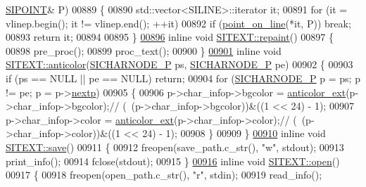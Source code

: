 \begin{DoxyCode}
      \hyperlink{struct_s_i_p_o_i_n_t}{SIPOINT}& P)
00889 \{
00890     std::vector<SILINE>::iterator it;
00891     \textcolor{keywordflow}{for} (it = vlinep.begin(); it != vlinep.end(); ++it)
00892         \textcolor{keywordflow}{if} (\hyperlink{kernal_8h_ae39165f0f00583edee6fe18ea6bdf5e3}{point\_on\_line}(*it, P)) \textcolor{keywordflow}{break};
00893     \textcolor{keywordflow}{return} it;
00894 
00895 \}
\hyperlink{class_s_i_t_e_x_t_a944194c2df3c4ba2c599de6fbe0f98c2}{00896} \textcolor{keyword}{inline} \textcolor{keywordtype}{void} \hyperlink{class_s_i_t_e_x_t_a944194c2df3c4ba2c599de6fbe0f98c2}{SITEXT::repaint}()
00897 \{
00898     pre\_proc();
00899     proc\_text();
00900 \}
\hyperlink{class_s_i_t_e_x_t_af62ce4105e9450cc8c2319fed9fa7218}{00901} \textcolor{keyword}{inline} \textcolor{keywordtype}{void} \hyperlink{class_s_i_t_e_x_t_af62ce4105e9450cc8c2319fed9fa7218}{SITEXT::anticolor}(\hyperlink{class_s_i_c_h_a_r_n_o_d_e}{SICHARNODE\_P} ps, 
      \hyperlink{class_s_i_c_h_a_r_n_o_d_e}{SICHARNODE\_P} pe)
00902 \{
00903     \textcolor{keywordflow}{if} (ps == NULL || pe == NULL) \textcolor{keywordflow}{return};
00904     \textcolor{keywordflow}{for} (\hyperlink{class_s_i_c_h_a_r_n_o_d_e}{SICHARNODE\_P} p = ps; p != pe; p = p->\hyperlink{class_s_i_c_h_a_r_n_o_d_e_ab188ae5c7731bcc66a1042defcf158c8}{nextp})
00905     \{
00906         p->char\_infop->bgcolor = \hyperlink{kernal_8h_abd07a7735390aea7bf376c2bcc75bd96}{anticolor\_ext}(p->char\_infop->bgcolor);\textcolor{comment}{//
      (~(p->char\_infop->bgcolor))&((1 << 24) - 1);}
00907         p->char\_infop->color = \hyperlink{kernal_8h_abd07a7735390aea7bf376c2bcc75bd96}{anticolor\_ext}(p->char\_infop->color);\textcolor{comment}{//
      (~(p->char\_infop->color))&((1 << 24) - 1);}
00908     \}
00909 \}
\hyperlink{class_s_i_t_e_x_t_a4dd44878d55139898fcead669e074c2e}{00910} \textcolor{keyword}{inline} \textcolor{keywordtype}{void} \hyperlink{class_s_i_t_e_x_t_a4dd44878d55139898fcead669e074c2e}{SITEXT::save}()
00911 \{
00912     freopen(save\_path.c\_str(), \textcolor{stringliteral}{"w"}, stdout);
00913     print\_info();
00914     fclose(stdout);
00915 \}
\hyperlink{class_s_i_t_e_x_t_a270a832a88596618a424d8d9f9d3cb80}{00916} \textcolor{keyword}{inline} \textcolor{keywordtype}{void} \hyperlink{class_s_i_t_e_x_t_a270a832a88596618a424d8d9f9d3cb80}{SITEXT::open}()
00917 \{
00918     freopen(open\_path.c\_str(), \textcolor{stringliteral}{"r"}, stdin);
00919     read\_info();

\end{DoxyCode}

